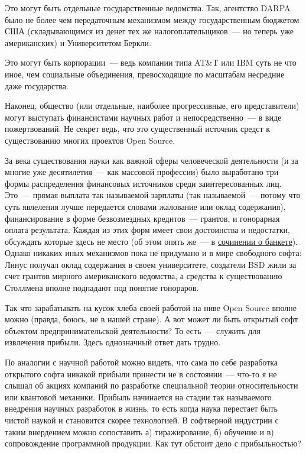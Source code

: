 Это могут быть отдельные государственные ведомства. Так, агентство DARPA было не более чем передаточным механизмом между государственным бюджетом США (складывающимся из денег тех же налогоплательщиков~--- но теперь уже американских) и Университетом Беркли.

Это могут быть корпорации~--- ведь компании типа AT\&T или IBM суть не что иное, чем социальные объединения, превосходящие по масштабам несредние даже государства.

Наконец, общество (или отдельные, наиболее прогрессивные, его представители) могут выступать финансистами научных работ и непосредственно~--- в виде пожертвований. Не секрет ведь, что это существенный источник средст к существованию многих проектов Open Source.

За века существования науки как важной сферы человеческой деятельности (и за многие уже десятилетия~--- как массовой профессии) было выработано три формы распределения финансовых источников среди заинтересованных лиц. Это~--- прямая выплата так называемой зарплаты (так называемой~--- потому что суть явлеления лучше передается словами жалование или оклад содержания), финансирование в форме безвозмездных кредитов~--- грантов, и гонорарная оплата результата. Каждая из этих форм имеет свои достоинства и недостатки, обсуждать которые здесь не место (об этом опять же~--- в \href{http://alv.me/?p=294}{сочинении о банкете}). Однако никаких иных механизмов пока не придумано и в мире свободного софта: Линус получал оклад содержания в своем университете, создатели BSD жили за счет грантов мирного американского ведомства, а средства к существованию Столлмена вполне подпадают под понятие гонораров.

Так что зарабатывать на кусок хлеба своей работой на ниве Open Source вполне можно (правда, боюсь, не в нашей стране). А вот может ли быть открытый софт объектом предпринимательской деятельности? То есть~--- служить для извлечения прибыли. Здесь однозначный ответ дать трудно.

По аналогии с научной работой можно видеть, что сама по себе разработка открытого софта никакой прибыли принести не в состоянии~--- что-то я не слышал об акциях компаний по разработке специальной теории относительности или квантовой механики. Прибыль начинается на стадии так называемого внедрения научных разработок в жизнь, то есть когда наука перестает быть чистой наукой и становится скорее технологией. В софтверной индустрии с таким внердением можно сопоставить а) тиражирование, б) обучение и в) сопровождение программной продукции. Как тут обстоит дело с прибыльностью?

